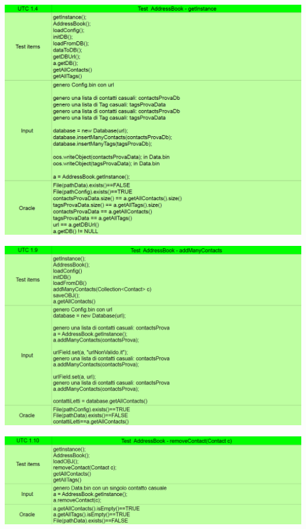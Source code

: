 \begin{center} \includegraphics[width=\linewidth]{images/UTC/1-4.png} \end{center}
\begin{center} \includegraphics[width=\linewidth]{images/UTC/1-9.png} \end{center}
\begin{center} \includegraphics[width=\linewidth]{images/UTC/1-10.png} \end{center}
